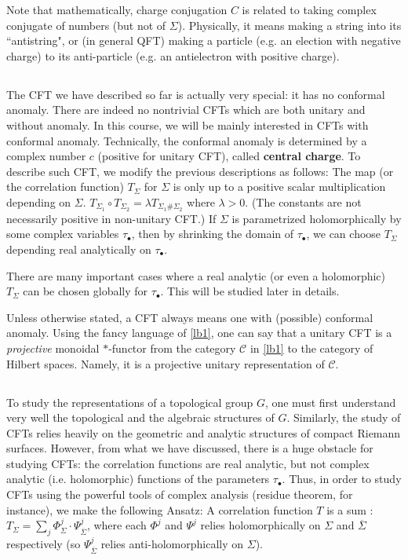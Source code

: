 \documentclass[12pt,a4paper,notitlepage]{article}
\theoremstyle{definition}
\theoremstyle{plain}
\newcommand{\ovl}{\overline}
\newcommand{\scr}{\mathscr}
\newcommand{\blt}{\bullet}
\numberwithin{equation}{section}
\begin{document}
Note that mathematically, charge conjugation $C$  is related to taking complex conjugate of numbers (but not of $\Sigma$). Physically, it means making a string  into its ``antistring", or (in general QFT) making a particle (e.g. an election with negative charge) to its anti-particle (e.g. an antielectron with positive charge). 



\subsection{}


The CFT we have described so far is actually very special: it has no conformal anomaly. There are indeed no nontrivial CFTs which are both unitary and without anomaly. In this course, we will be mainly interested in CFTs with {conformal anomaly}. Technically, the conformal anomaly is determined by a complex number $c$ (positive for unitary CFT), called \textbf{central charge}. To describe such CFT, we modify the previous descriptions as follows: The map (or the correlation function) $T_\Sigma$ for $\Sigma$ is only up to a positive scalar multiplication depending on $\Sigma$. $T_{\Sigma_1}\circ T_{\Sigma_2}=\lambda T_{\Sigma_1\#\Sigma_2}$ where $\lambda>0$. (The constants are not necessarily positive in non-unitary CFT.) If $\Sigma$ is parametrized holomorphically by some complex variables $\tau_\blt$, then by shrinking the domain of $\tau_\blt$, we can choose $T_\Sigma$ depending real analytically on $\tau_\blt$. 

There are many important cases where a real analytic (or even a holomorphic) $T_\Sigma$ can be chosen globally for $\tau_\blt$. This will be studied later in details. 

Unless otherwise stated, a CFT always means one with (possible) conformal anomaly. Using the fancy language of \ref{lb1}, one can say that a unitary CFT is a \emph{projective} monoidal $*$-functor from the category $\scr C$ in \ref{lb1} to the category of Hilbert spaces. Namely, it is a projective unitary representation of $\scr C$.


\subsection{}\label{lb35}

To study the representations of a topological group $G$, one must first understand very well the topological and the algebraic structures of $G$. Similarly, the study of CFTs relies heavily on the geometric and analytic structures of compact Riemann surfaces. However, from what we have discussed, there is a huge obstacle for studying CFTs: the correlation functions are real analytic, but not complex analytic (i.e. holomorphic) functions of the parameters $\tau_\blt$. Thus, in order to study CFTs using the powerful tools of complex analysis (residue theorem, for instance), we make the following Ansatz: A correlation function $T$ is a sum : $T_\Sigma=\sum_j \Phi^j_{\Sigma}\cdot \Psi^j_{\ovl\Sigma}$, where each $\Phi^j$ and $\Psi^j$ relies holomorphically on $\Sigma$ and $\ovl\Sigma$ respectively (so $\Psi^j_{\ovl\Sigma}$ relies anti-holomorphically on $\Sigma$).
\end{document}
